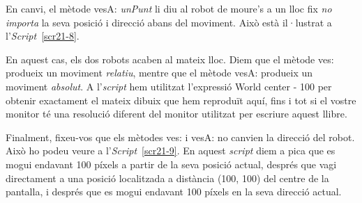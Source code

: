 En canvi, el mètode \textsf{vesA: {\itshape unPunt}} li diu al robot de moure's a un lloc fix \emph{no importa} la seva posició i direcció abans del moviment. Això està il·lustrat a l'\emph{Script}~\ref{scr21-8}.


En aquest cas, els dos robots acaben al mateix lloc. Diem que el mètode \textsf{ves:} produeix un moviment \emph{relatiu}, mentre que el mètode \textsf{vesA:} produeix un moviment \emph{absolut}. A l'\emph{script} hem utilitzat l'expressió \textsf{World center - 100} per obtenir exactament el mateix dibuix que hem reproduït aquí, fins i tot si el vostre monitor té una resolució diferent del monitor utilitzat per escriure aquest llibre.

Finalment, fixeu-vos que els mètodes \textsf{ves:} i \textsf{vesA:} no canvien la direcció del robot. Això ho podeu veure a l'\emph{Script}~\ref{scr21-9}. En aquest \emph{script} diem a pica que es mogui endavant 100 píxels a partir de la seva posició actual, després que vagi directament a una posició localitzada a distància (100, 100) del centre de la pantalla, i després que es mogui endavant 100 píxels en la seva direcció actual.

